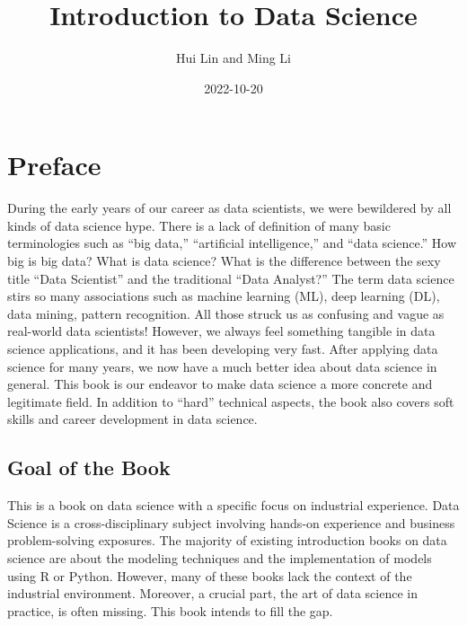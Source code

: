 \documentclass[
  12pt,
]{krantz}
\title{Introduction to Data Science}
\author{Hui Lin and Ming Li}
\date{2022-10-20}
\begin{document}
\maketitle

\thispagestyle{empty}
\begin{center}
\end{center}

\setlength{\abovedisplayskip}{-5pt}
\setlength{\abovedisplayshortskip}{-5pt}

{
\hypersetup{linkcolor=}
\setcounter{tocdepth}{2}
\tableofcontents
}
\listoffigures
\listoftables
\hypertarget{preface}{%
\chapter*{Preface}\label{preface}}


During the early years of our career as data scientists, we were bewildered by all kinds of data science hype. There is a lack of definition of many basic terminologies such as ``big data,'' ``artificial intelligence,'' and ``data science.'' How big is big data? What is data science? What is the difference between the sexy title ``Data Scientist'' and the traditional ``Data Analyst?'' The term data science stirs so many associations such as machine learning (ML), deep learning (DL), data mining, pattern recognition. All those struck us as confusing and vague as real-world data scientists! However, we always feel something tangible in data science applications, and it has been developing very fast. After applying data science for many years, we now have a much better idea about data science in general. This book is our endeavor to make data science a more concrete and legitimate field. In addition to ``hard'' technical aspects, the book also covers soft skills and career development in data science.

\hypertarget{goal-of-the-book}{%
\section*{Goal of the Book}\label{goal-of-the-book}}


This is a book on data science with a specific focus on industrial experience. Data Science is a cross-disciplinary subject involving hands-on experience and business problem-solving exposures. The majority of existing introduction books on data science are about the modeling techniques and the implementation of models using R or Python. However, many of these books lack the context of the industrial environment. Moreover, a crucial part, the art of data science in practice, is often missing. This book intends to fill the gap.
\end{document}

